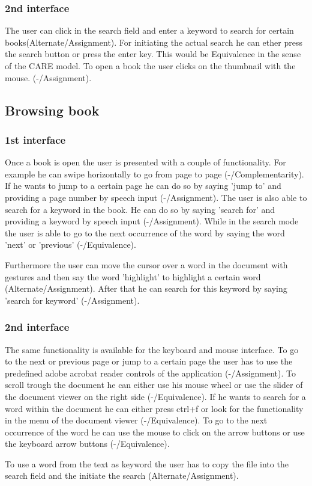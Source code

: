 \documentclass[a4paper, 10pt]{article}
\begin{document}
	\subsubsection{2nd interface}
	
	\par{The user can click in the search field and enter a keyword to search for certain books(Alternate/Assignment). For initiating the actual search he can ether press the search button or press the enter key. This would be Equivalence in the sense of the CARE model. To open a book the user clicks on the thumbnail with the mouse. (-/Assignment).}
	
	\subsection{Browsing book}
	
	\subsubsection{1st interface}
	
	\par{Once a book is open the user is presented with a couple of functionality. For example he can swipe horizontally to go from page to page (-/Complementarity). If he wants to jump to a certain page he can do so by saying 'jump to' and providing a page number by speech input (-/Assignment). The user is also able to search for a keyword in the book. He can do so by saying 'search for' and providing a keyword by speech input (-/Assignment). While in the search mode the user is able to go to the next occurrence of the word by saying the word 'next' or 'previous' (-/Equivalence).}
	\par{Furthermore the user can move the cursor over a word in the document with gestures and then say the word 'highlight' to highlight a certain word (Alternate/Assignment). After that he can search for this keyword by saying 'search for keyword' (-/Assignment).  }
	
	\subsubsection{2nd interface}
	
	\par{The same functionality is available for the keyboard and mouse interface. To go to the next or previous page or jump to a certain page the user has to use the predefined adobe acrobat reader controls of the application (-/Assignment). To scroll trough the document he can either use his mouse wheel or use the slider of the document viewer on the right side (-/Equivalence). If he wants to search for a word within the document he can either press ctrl+f or look for the functionality in the menu of the document viewer (-/Equivalence). To go to the next occurrence of the word he can use the mouse to click on the arrow buttons or use the keyboard arrow buttons (-/Equivalence).}
	\par{To use a word from the text as keyword the user has to copy the file into the search field and the initiate the search (Alternate/Assignment).}
	
\end{document}
